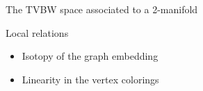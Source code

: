 \documentclass[final,t, mathserif]{beamer}
\newcommand{\ph}{\varphi}
\newcommand{\ee}{\mathbf{e}}
\DeclareMathOperator{\Obj}{Obj}
\DeclareMathOperator{\Hom}{Hom}
\theoremstyle{plain}
\theoremstyle{definition}
\begin{document}
\begin{frame}{}
\begin{columns}[t]
\begin{column}{.3\linewidth}
\begin{block}{The TVBW space associated to a 2-manifold}
\end{block}





\begin{block}{Local relations}
\begin{itemize}
\item Isotopy of the graph embedding
\item Linearity in the vertex colorings
\end{itemize}

\begin{figure}[ht]


\end{figure}
\end{block}
\end{column}
\end{columns}
\end{frame}
\end{document}
